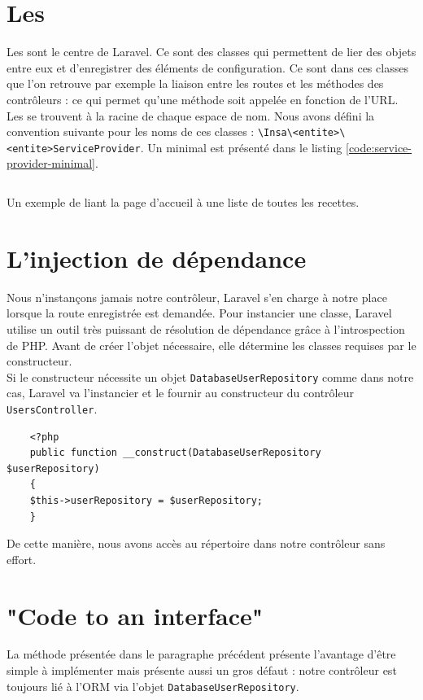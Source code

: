 \section{Les \servicesProvider{}}
	Les \servicesProvider{} sont le centre de Laravel. Ce sont des classes qui permettent de lier des objets entre eux et d'enregistrer des éléments de configuration. Ce sont dans ces classes que l'on retrouve par exemple la liaison entre les routes et les méthodes des contrôleurs : ce qui permet qu'une méthode soit appelée en fonction de l'URL.\\

	Les \servicesProvider{} se trouvent à la racine de chaque espace de nom. Nous avons défini la convention suivante pour les noms de ces classes : \verb|\Insa\<entite>\<entite>ServiceProvider|. Un \serviceProvider{} minimal est présenté dans le listing \ref{code:service-provider-minimal}.
	\begin{listing}[H]
		\inputminted{php}{code/serviceProvider.php}
		\caption{Un exemple de \serviceProvider{} liant la page d'accueil à une liste de toutes les recettes.}
		\label{code:service-provider-minimal}
	\end{listing}

\section{L'injection de dépendance}
	Nous n'instançons jamais notre contrôleur, Laravel s'en charge à notre place lorsque la route enregistrée est demandée. Pour instancier une classe, Laravel utilise un outil très puissant de résolution de dépendance grâce à l'introspection de PHP. Avant de créer l'objet nécessaire, elle détermine les classes requises par le constructeur.\\

	Si le constructeur nécessite un objet \verb|DatabaseUserRepository| comme dans notre cas, Laravel va l'instancier et le fournir au constructeur du contrôleur \verb|UsersController|.
	\begin{verbatim}
	<?php
	public function __construct(DatabaseUserRepository $userRepository)
	{
	$this->userRepository = $userRepository;
	}
	\end{verbatim}

	De cette manière, nous avons accès au répertoire dans notre contrôleur sans effort.

\section{"Code to an interface"}
	La méthode présentée dans le paragraphe précédent présente l'avantage d'être simple à implémenter mais présente aussi un gros défaut : notre contrôleur est toujours lié à l'ORM via l'objet \verb|DatabaseUserRepository|.\\

